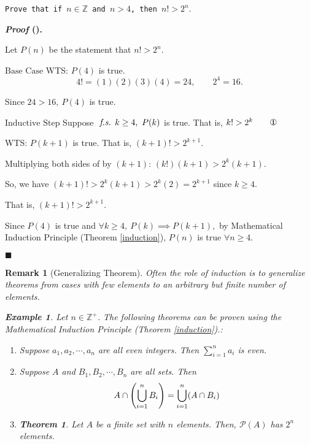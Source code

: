 \documentclass[12pt,a4paper]{article}
\newtheorem{thm}{Theorem}[subsection]
\newtheorem{eg}{Example}[subsection]
\newcounter{nprf}[subsection]
\newtheorem*{rmk}{\indent Remark}
\newenvironment*{prf}{\par\indent\textbf{\textit{Proof} (\stepcounter{nprf}\thenprf). }\par }{\par\hfill $\blacksquare$\par}
\def\Z{{\mathbb{Z}}}
\def\Zp{{\Z^{+}}}
\def\pow{{\mathcal{P}}}
\def\fs{\emph{ f.s. }}
\begin{document}
\begin{framed}
\noindent\texttt{Prove that if $n\in\Z$ and $n>4$, then $n!>2^n.$}
\begin{prf}
	Let $P(n)$ be the statement that $n!>2^n.$\par$\boxed{\text{Base Case}}$ WTS: $P(4)$ is true. \[4!=(1)(2)(3)(4)=24,\qquad 2^4=16.\]\par\hspace{5mm} Since $24>16,\ P(4)$ is true.\par$\boxed{\text{Inductive Step}}$ Suppose $\fs k\geq4,\ P(k)$ is true. That is, $k!>2^k\qquad\text{\ding{172}}$\par\hspace{5mm} WTS: $P(k+1)$ is true. That is, $(k+1)!>2^{k+1}.$\par\hspace{5mm} Multiplying both sides of  by $(k+1)$: $(k!)(k+1)>2^k(k+1).$\par\hspace{5mm} So, we have $(k+1)!>2^k(k+1)>2^k(2)=2^{k+1}$ since $k\geq4.$\par\hspace{5mm} That is, $(k+1)!>2^{k+1}$.\par Since $P(4)$ is true and $\forall k\geq4,\ P(k)\implies P(k+1),$ by Mathematical Induction Principle (Theorem \ref{induction}), $P(n)$ is true $\forall n\geq4.$
\end{prf}
\end{framed}
\begin{rmk}[Generalizing Theorem]
	Often the role of induction is to generalize theorems from cases with few elements to an arbitrary but finite number of elements. 
\begin{eg}
	Let $n\in\Zp$. The following theorems can be proven using the Mathematical Induction Principle (Theorem \ref{induction}).: 
	\begin{enumerate}
		\item Suppose $a_1,a_2,\cdots,a_n$ are all even integers. Then $\displaystyle\sum_{i=1}^na_i$ is even.
		\item Suppose $A$ and $B_1,B_2,\cdots,B_n$ are all sets. Then \[A\cap\qty(\bigcup_{i=1}^nB_i)=\bigcup_{i=1}^n(A\cap B_i)\]
		\item \begin{thm} Let $A$ be a finite set with $n$ elements. Then, $\pow(A)$ has $2^n$ elements. \end{thm}
	\end{enumerate}
\end{eg}
\end{rmk}
\end{document}
